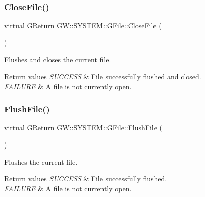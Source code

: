 \subsubsection{\texorpdfstring{CloseFile()}{CloseFile()}}
{\footnotesize\ttfamily virtual \mbox{\hyperlink{namespaceGW_a67a839e3df7ea8a5c5686613a7a3de21}{G\+Return}} G\+W\+::\+S\+Y\+S\+T\+E\+M\+::\+G\+File\+::\+Close\+File (\begin{DoxyParamCaption}{ }\end{DoxyParamCaption})\hspace{0.3cm}{\ttfamily [pure virtual]}}



Flushes and closes the current file. 


\begin{DoxyRetVals}{Return values}
{\em S\+U\+C\+C\+E\+SS} & File successfully flushed and closed. \\
\hline
{\em F\+A\+I\+L\+U\+RE} & A file is not currently open. \\
\hline
\end{DoxyRetVals}
\mbox{\label{classGW_1_1SYSTEM_1_1GFile_ae3105b637ef87af268722a696b8657a9}} 
\subsubsection{\texorpdfstring{FlushFile()}{FlushFile()}}
{\footnotesize\ttfamily virtual \mbox{\hyperlink{namespaceGW_a67a839e3df7ea8a5c5686613a7a3de21}{G\+Return}} G\+W\+::\+S\+Y\+S\+T\+E\+M\+::\+G\+File\+::\+Flush\+File (\begin{DoxyParamCaption}{ }\end{DoxyParamCaption})\hspace{0.3cm}{\ttfamily [pure virtual]}}



Flushes the current file. 


\begin{DoxyRetVals}{Return values}
{\em S\+U\+C\+C\+E\+SS} & File successfully flushed. \\
\hline
{\em F\+A\+I\+L\+U\+RE} & A file is not currently open. \\
\hline
\end{DoxyRetVals}
\mbox{\label{classGW_1_1SYSTEM_1_1GFile_a6853b717e838d1b3a54f22449a37d764}} 
